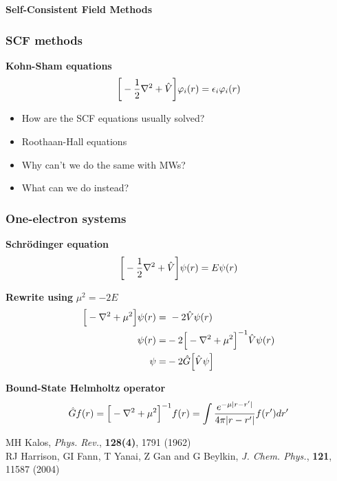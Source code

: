 \begin{frame}
  \centering
  \textbf{\Large{Self-Consistent Field Methods}}
\end{frame}

\begin{frame}
  \frametitle{SCF methods}
  \centering
  \textbf{Kohn-Sham equations}
  \begin{equation}
    \nonumber
    \bigg[-\frac{1}{2}\nabla^2 + \hat{V}\bigg]\varphi_i(r) = \epsilon_i \varphi_i(r)
  \end{equation}

  \begin{itemize}
    \item How are the SCF equations usually solved?
    \item Roothaan-Hall equations
    \item Why can't we do the same with MWs?
    \item What can we do instead?
  \end{itemize}
\end{frame}

\begin{frame}
  \frametitle{One-electron systems}
  \centering
  \textbf{Schr\"{o}dinger equation}
  \begin{equation}
    \nonumber
    \bigg[-\frac{1}{2}\nabla^2 + \hat{V}\bigg]\psi(r) = E \psi(r)
  \end{equation}

  \vspace{5mm}

  \textbf{Rewrite using} $\mu^2 = -2E$
  \begin{align}
    \nonumber
    \Big[-\nabla^2 + \mu^2\Big]\psi(r) =&\ -2 \hat{V} \psi(r)\\
    \nonumber
    \psi(r) =&-2\Big[-\nabla^2 + \mu^2\Big]^{-1} \hat{V} \psi(r)\\
    \nonumber
    \psi =&-2\hat{G}\Big[\hat{V} \psi\Big]
  \end{align}

  \vspace{5mm}

  \textbf{Bound-State Helmholtz operator}
  \begin{equation}
    \nonumber
    \hat{G} f(r) = \Big[-\nabla^2 + \mu^2\Big]^{-1} f(r) = \int \frac{e^{-\mu |r-r'|}}{4\pi|r-r'|}f(r')dr'
  \end{equation}

  \vspace{5mm}

  \centering
  \tiny
  MH Kalos,
  {\it Phys. Rev.},
  \textbf{128(4)},
  1791 (1962)\\
  RJ Harrison, GI Fann, T Yanai, Z Gan and G Beylkin,
  {\it J. Chem. Phys.},
  \textbf{121},
  11587 (2004)
\end{frame}

